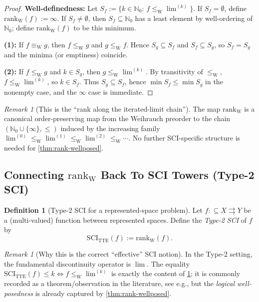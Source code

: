 \documentclass{lmcs} %
\theoremstyle{plain}
\theoremstyle{plain}
\theoremstyle{definition}
\newtheorem{definition}[theorem]{Definition}
\theoremstyle{remark}
\newtheorem{remark}[theorem]{Remark}
\theoremstyle{definition}
\theoremstyle{remark}
\numberwithin{equation}{section}
\newcommand{\N}{\mathbb{N}}
\newcommand{\Lim}{\operatorname{lim}}
\newcommand{\Limi}[1]{\Lim^{(#1)}}
\begin{document}
\begin{proof}
\textbf{Well-definedness:} Let $S_f:=\{k\in\N_0:\ f\le_{\mathrm{W}}\Limi{k}\}$.
If $S_f=\emptyset$, define $\mathrm{rank}_{\mathrm{W}}(f):=\infty$.
If $S_f\neq\emptyset$, then $S_f\subseteq\N_0$ has a least element by well-ordering of $\N_0$; define $\mathrm{rank}_{\mathrm{W}}(f)$ to be this minimum.

\textbf{(1):} If $f\equiv_{\mathrm{W}} g$, then $f\le_{\mathrm{W}}g$ and $g\le_{\mathrm{W}}f$.
Hence $S_g\subseteq S_f$ and $S_f\subseteq S_g$, so $S_f=S_g$ and the minima (or emptiness) coincide.

\textbf{(2):} If $f\le_{\mathrm{W}}g$ and $k\in S_g$, then $g\le_{\mathrm{W}}\Limi{k}$.
By transitivity of $\le_{\mathrm{W}}$, $f\le_{\mathrm{W}}\Limi{k}$, so $k\in S_f$.
Thus $S_g\subseteq S_f$, hence $\min S_f \le \min S_g$ in the nonempty case, and the $\infty$ case is immediate.
\end{proof}

\begin{remark}[This is the \enquote{rank along the iterated-limit chain}]\label{rem:rank-chain}
The map $\mathrm{rank}_{\mathrm{W}}$ is a canonical order-preserving map from the Weihrauch preorder to the chain $(\N_0\cup\{\infty\},\le)$ induced by the increasing family
$\Limi{0}\le_{\mathrm{W}}\Limi{1}\le_{\mathrm{W}}\Limi{2}\le_{\mathrm{W}}\cdots$.
No further SCI-specific structure is needed for \cref{thm:rank-wellposed}.
\end{remark}

\subsection{Connecting \texorpdfstring{$\mathrm{rank}_{\mathrm{W}}$}{rankW} Back To SCI Towers (Type-2 SCI)}

\begin{definition}[Type-2 SCI for a represented-space problem]\label{def:type2sci}
Let $f:\subseteq X\rightrightarrows Y$ be a (multi-valued) function between represented spaces.
Define the \textit{Type-2 SCI} of $f$ by
\[
\mathrm{SCI}_{\mathrm{TTE}}(f):=\mathrm{rank}_{\mathrm{W}}(f).
\]
\end{definition}

\begin{remark}[Why this is the correct \enquote{effective} SCI notion]\label{rem:np-remark}
In the Type-2 setting, the fundamental discontinuity operator is $\Lim$.
The equality $\mathrm{SCI}_{\mathrm{TTE}}(f)\le k \iff f\le_{\mathrm{W}}\Limi{k}$
is exactly the content of \cref{def:type2sci}; it is commonly recorded as a theorem/observation in the literature, see e.g., \cite[Observation 43]{neumann2018topological} but the \textit{logical well-posedness} is already captured by \cref{thm:rank-wellposed}.
\end{remark}
\end{document}

